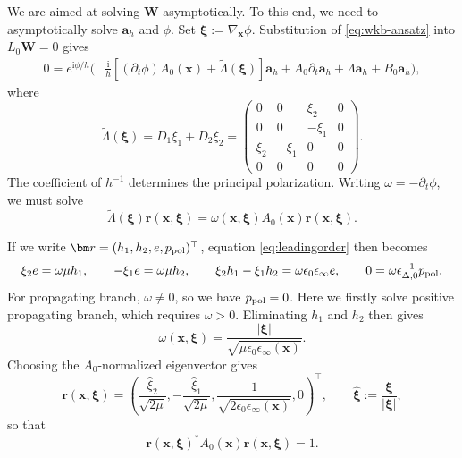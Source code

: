 \documentclass[11pt,reqno]{amsart}
\newcommand{\ii}{\mathrm{i}}
\numberwithin{equation}{section}
\begin{document}
We are aimed at solving $\bm W$ asymptotically. To this end, we need to asymptotically solve $\bm a_h$ and $\phi$. Set $\bm\xi:=\nabla_{\bm x}\phi$. Substitution of \eqref{eq:wkb-ansatz} into $L_0\bm W=0$ gives
\begin{equation*}
\begin{aligned}
0=e^{\ii\phi/h}\bigg(&\frac{\ii}{h}\left[(\partial_t\phi)A_0(\bm x)+\widetilde\Lambda(\bm\xi)\right]\bm a_h+A_0\partial_t\bm a_h+\Lambda\bm a_h+B_0\bm a_h\bigg),
\end{aligned}
\end{equation*}
where
\begin{equation*}
    \widetilde\Lambda(\bm\xi)
    =D_1\xi_1+D_2\xi_2
    =\begin{pmatrix}
        0 & 0 & \xi_2 & 0\\
        0 & 0 & -\xi_1 & 0\\
        \xi_2 & -\xi_1 & 0 & 0\\
        0 & 0 & 0 & 0
      \end{pmatrix}.
\end{equation*}
The coefficient of $h^{-1}$ determines the principal polarization. Writing $\omega=-\partial_t\phi$, we must solve
\begin{equation}\label{eq:leadingorder}
    \widetilde\Lambda(\bm\xi)\bm r(\bm x,\bm\xi) = \omega(\bm x,\bm\xi)A_0(\bm x)\bm r(\bm x,\bm\xi).
\end{equation}

If we write $\bm r=(h_1,h_2,e,p_{\rm pol})^\top$, equation \eqref{eq:leadingorder} then becomes
\begin{equation*}
    \xi_2e=\omega\mu h_1,\qquad
    -\xi_1e=\omega\mu h_2,\qquad
    \xi_2h_1-\xi_1h_2=\omega\epsilon_0\epsilon_\infty e,
    \qquad
    0=\omega\epsilon_{\Delta,0}^{-1}p_{\rm pol}.
\end{equation*}
For propagating branch, $\omega\neq 0$, so we have $p_{\rm pol}=0$. Here we firstly solve positive propagating branch, which requires $\omega>0$. Eliminating $h_1$ and $h_2$ then gives
\begin{equation}\label{eq:positive-dispersion}
    \omega(\bm x,\bm\xi)
    =\frac{|\bm\xi|}{\sqrt{\mu\epsilon_0\epsilon_\infty(\bm x)}}.
\end{equation}
Choosing the $A_0$-normalized eigenvector gives
\begin{equation}\label{eq:explicit-r-positive-branch}
    \bm r(\bm x,\bm\xi)
    =\left(\frac{\widehat\xi_2}{\sqrt{2\mu}}, -\frac{\widehat\xi_1}{\sqrt{2\mu}}, \frac{1}{\sqrt{2\epsilon_0\epsilon_\infty(\bm x)}}, 0\right)^\top, \qquad
    \widehat{\bm\xi}:=\frac{\bm\xi}{|\bm\xi|},
\end{equation}
so that
\begin{equation*}
    \bm r(\bm x,\bm\xi)^*A_0(\bm x)\bm r(\bm x,\bm\xi)=1.
\end{equation*}
\end{document}
